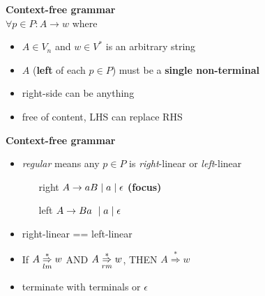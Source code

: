 {\footnotesize
\begin{minipage}[t]{0.5\linewidth}
  \textbf{Context-free grammar}\\
\(\forall p \in P: A \rightarrow w\) where
\begin{itemize}
\item \(A \in V_{n}\) and \(w \in V^{*}\) is an arbitrary string
\item \(A\) (\textbf{left} of each \(p \in P\)) must be a \textbf{single non-terminal}
\item right-side can be anything
\item free of content, LHS can replace RHS
\end{itemize}
\end{minipage}
\begin{minipage}[t]{0.5\linewidth}
  \textbf{Context-free grammar}
\begin{itemize}
\item \emph{regular} means any \(p \in P\) is \emph{right}-linear or \emph{left}-linear
  \begin{itemize}[leftmargin=3em]
  \item[right] \(A \rightarrow aB \;|\; a \;|\; \epsilon\) \textbf{(focus)}
  \item[left] \(A \rightarrow Ba\ \;|\; a \;|\; \epsilon\)
  \end{itemize}
\item right-linear == left-linear
\item If \(A \overset{*}{\underset{lm}{\Rightarrow}} w\) AND \(A \overset{*}{\underset{rm}{\Rightarrow}} w\), THEN \(A \overset{*}{\Rightarrow} w\)
\item terminate with terminals or \(\epsilon\)
\end{itemize}
\end{minipage}
}
